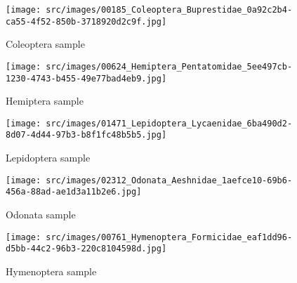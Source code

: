 \begin{figure}[!ht]
    \centering
    \begin{minipage}[t]{.4\textwidth}
        \vspace{0pt}
        \texttt{[image: src/images/00185\_Coleoptera\_Buprestidae\_0a92c2b4-ca55-4f52-850b-3718920d2c9f.jpg]}
        \caption{Coleoptera sample}
        \label{fig:coleoptera-sample}
    \end{minipage}
    \hfill
    \begin{minipage}[t]{.4\textwidth}
        \vspace{0pt}
        \texttt{[image: src/images/00624\_Hemiptera\_Pentatomidae\_5ee497cb-1230-4743-b455-49e77bad4eb9.jpg]}
        \caption{Hemiptera sample}
        \label{fig:hemiptera-sample}
    \end{minipage}
    \begin{minipage}[t]{.4\textwidth}
        \vspace{0.3cm}
        \texttt{[image: src/images/01471\_Lepidoptera\_Lycaenidae\_6ba490d2-8d07-4d44-97b3-b8f1fc48b5b5.jpg]}
        \caption{Lepidoptera sample}
        \label{fig:lepidoptera-sample}
    \end{minipage}
    \hfill
    \begin{minipage}[t]{.4\textwidth}
        \vspace{0.3cm}
        \texttt{[image: src/images/02312\_Odonata\_Aeshnidae\_1aefce10-69b6-456a-88ad-ae1d3a11b2e6.jpg]}
        \caption{Odonata sample}
        \label{fig:odonata-sample}
    \end{minipage}
    \begin{minipage}[t]{.4\textwidth}
        \vspace{0.3cm}
        \texttt{[image: src/images/00761\_Hymenoptera\_Formicidae\_eaf1dd96-d5bb-44c2-96b3-220c8104598d.jpg]}
        \caption{Hymenoptera sample}
        \label{fig:hymenoptera-sample}
    \end{minipage}
\end{figure}

